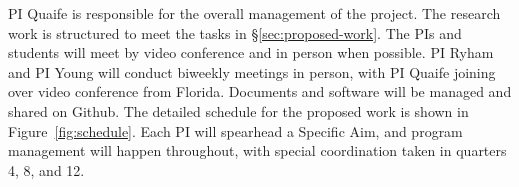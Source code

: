 PI Quaife is responsible for the overall management of the project.
The research work is structured to meet the tasks
in \S\ref{sec:proposed-work}. The PIs and students will meet
by video conference and in person when possible. PI Ryham and PI Young
will conduct biweekly meetings in person, with PI Quaife joining over
video conference from Florida. 
Documents and 
software will be managed and shared on \textsf{Github}.
%
%
The detailed schedule for the proposed work is shown in
Figure~\ref{fig:schedule}. Each PI will spearhead a Specific Aim, and
program management will happen throughout, with special coordination
taken in quarters 4, 8, and 12.


